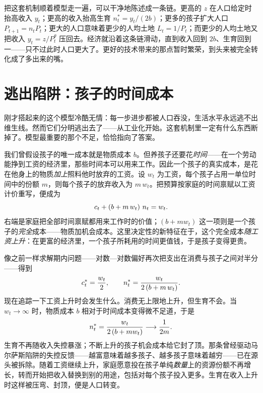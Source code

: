 把这套机制顺着模型走一遍，可以干净地陈述成一条链。更高的 $z$ 在人口给定时抬高收入 $y_t$；更高的收入抬高生育 $n_t^{*} = y_t/(2b)$；更多的孩子扩大人口 $P_{t+1} = n_t P_t$；更大的人口意味着更少的人均土地 $L_t = 1/P_t$；而更少的人均土地又把收入 $y_t = z/P_t^{\theta}$ 压回去。经济就沿着这条链滑动，直到收入回到 $2b$、生育回到一——只不过此时人口更大了。更好的技术带来的那点暂时繁荣，到头来被完全转化成了多出来的嘴。


\section{逃出陷阱：孩子的时间成本}

刚才搭起来的这个模型冷酷无情：每一步进步都被人口吞没，生活水平永远逃不出维生线。然而它们分明逃出去了——从工业化开始。这套机制里一定有什么东西断掉了。模型最重要的那个不足，恰恰指向了答案。

我们曾假设孩子的唯一成本就是物质成本 $b$。但养孩子还要花\emph{时间}——在一个劳动能挣到工资的经济里，那些时间本可以用来工作。因此一个孩子的真实成本，是花在他身上的物质\emph{加上}照料他时放弃的工资。设 $w_t$ 为工资，每个孩子占用一单位时间中的份额 $m$，则每个孩子的放弃收入为 $m\,w_t$。把预算按家庭的时间禀赋以工资计价重写，便成为
\begin{equation}
c_t + \left(b + m\, w_t\right)\, n_t = w_t.
\label{eq:malthus-time-budget}
\end{equation}
右端是家庭把全部时间禀赋都用来工作时的价值；$(b + m w_t)$ 这一项则是一个孩子的\emph{完全}成本——物质加机会成本。这里决定性的新特征在于，这个完全成本\emph{随工资上升}：在更富的经济里，一个孩子所耗用的时间更值钱，于是孩子变得更贵。

像之前一样求解期内问题——对数—对数偏好再次把支出在消费与孩子之间对半分——得到
\[
c_t^{*} = \frac{w_t}{2},
\qquad
n_t^{*} = \frac{w_t}{2\left(b + m\, w_t\right)}.
\]
现在追踪一下工资上升时会发生什么。消费无上限地上升，但生育不会。当 $w_t \to \infty$ 时，物质成本 $b$ 相对于时间成本变得微不足道，于是
\[
n_t^{*} = \frac{w_t}{2\left(b + m w_t\right)} \longrightarrow \frac{1}{2m}.
\]
生育不再随收入失控暴涨；不断上升的孩子机会成本给它封了顶。那条曾经驱动马尔萨斯陷阱的失控反馈——越富意味着越多孩子、越多孩子意味着越穷——已在源头被拆除。随着工资继续上升，家庭愿意投在孩子单纯\emph{数量}上的资源份额不再增长，转而开始把收入替换到别的用途，包括对每个孩子投入更多。生育在收入上升时这样被压弯、封顶，便是人口转变。

